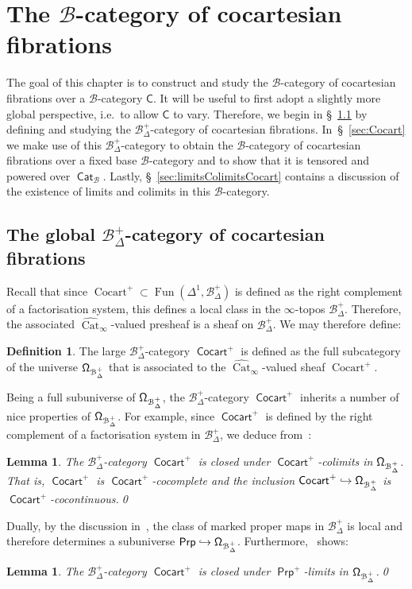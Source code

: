 \documentclass[reqno]{amsart}
\numberwithin{equation}{subsection}
\theoremstyle{plain}
\newtheorem{lemma}[equation]{Lemma}
\theoremstyle{definition}
\newtheorem{definition}[equation]{Definition}
\let\scr=\mathcal
\let\into=\hookrightarrow
\def\BB{\scr B}
\DeclareMathOperator{\Cat}{Cat}
\DeclareMathOperator{\ICat}{\mathsf{Cat}}
\DeclareMathOperator{\Cocart}{Cocart}
\DeclareMathOperator{\ICocart}{\mathsf{Cocart}}
\DeclareMathOperator{\Fun}{Fun}
\DeclareMathOperator{\IProp}{\mathsf{Prp}}
\newcommand{\I}[1]{\mathsf{#1}}
\newcommand{\mSimp}[1]{#1_{\Delta}^+}
\newcommand{\CatSS}{\widehat{\Cat}_\infty}
\begin{document}
\section{The $\BB$-category of cocartesian fibrations}
\label{sec:CategoryOfCocartesianFibrations}
The goal of this chapter is to construct and study the $\BB$-category of cocartesian fibrations over a $\BB$-category $\I{C}$. It will be useful to first adopt a slightly more global perspective, i.e.\ to allow $\I{C}$ to vary. Therefore, we begin in \S~\ref{sec:Cocart+} by defining and studying the $\mSimp\BB$-category of cocartesian fibrations. In~\S~\ref{sec:Cocart} we make use of this $\mSimp\BB$-category to obtain the $\BB$-category of cocartesian fibrations over a fixed base $\BB$-category and to show that it is tensored and powered over $\ICat_{\BB}$. Lastly, \S~\ref{sec:limitsColimitsCocart} contains a discussion of the existence of limits and colimits in this $\BB$-category.

\subsection{The global $\mSimp\BB$-category of cocartesian fibrations}
\label{sec:Cocart+}
Recall that since $\Cocart^+\subset\Fun(\Delta^1,\mSimp\BB)$ is defined as the right complement of a factorisation system, this defines  a local class in the $\infty$-topos $\mSimp\BB$. Therefore, the associated $\CatSS$-valued presheaf is a sheaf on $\mSimp\BB$. We may therefore define:
\begin{definition}
	The large $\mSimp\BB$-category $\ICocart^+$ is defined as the full subcategory of the universe $\Univ[\mSimp\BB]$ that is associated to the $\CatSS$-valued sheaf $\Cocart^+$.
\end{definition}
Being a full subuniverse of $\Univ[\mSimp\BB]$, the $\mSimp\BB$-category $\ICocart^+$ inherits a number of nice properties of $\Univ[\mSimp\BB]$.
For example, since $\ICocart^+$ is defined by the right complement of a factorisation system in $\mSimp\BB$, we deduce from~\cite[Example~5.3.3]{Martini2021a}:
\begin{lemma}
	\label{lem:CocartCocartCocomplete}
	The $\mSimp\BB$-category $\ICocart^+$ is  closed under $\ICocart^+$-colimits in $\Univ[\mSimp\BB]$. That is, $\ICocart^+$ is $\ICocart^+$-cocomplete and the inclusion $\ICocart^+\into\Univ[\mSimp\BB]$ is $\ICocart^+$-cocontinuous.\qed
\end{lemma}
Dually, by the discussion in~\cite[\S~5.4]{Martini2021a}, the class of marked proper maps in $\mSimp\BB$ is local and therefore determines a subuniverse $\IProp\into\Univ[\mSimp\BB]$. Furthermore,~\cite[Proposition~5.4.2]{Martini2021a} shows:
\begin{lemma}
	\label{lem:CocartPrpComplete}
	The $\mSimp\BB$-category $\ICocart^+$ is closed under $\IProp^+$-limits in $\Univ[\mSimp\BB]$.\qed
\end{lemma}
\end{document}
